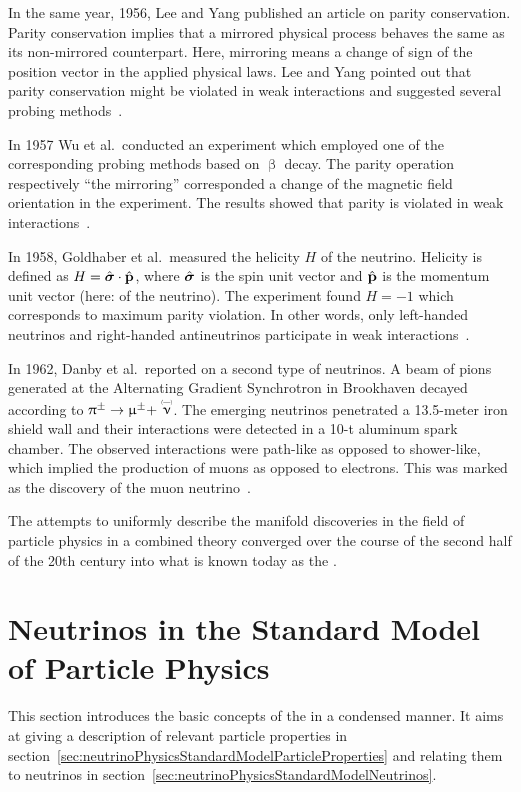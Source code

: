 In the same year, 1956, Lee and Yang published an article on parity conservation. Parity conservation implies that a mirrored physical process behaves the same as its non-mirrored counterpart. Here, mirroring means a change of sign of the position vector in the applied physical laws. Lee and Yang pointed out that parity conservation might be violated in weak interactions and suggested several probing methods~\cite{Lee1956}. 

In 1957 Wu et al.~conducted an experiment which employed one of the corresponding probing methods based on $\upbeta$ decay. The parity operation respectively ``the mirroring'' corresponded a change of the magnetic field orientation in the experiment. The results showed that parity is violated in weak interactions~\cite{Wu1957}. 

In 1958, Goldhaber et al.~measured the helicity $H$ of the neutrino. Helicity is defined as $ H = \hat{\boldsymbol{\mathbf{\sigma}}} \cdot \hat{\boldsymbol{\mathbf{p}}}$, where $\hat{\boldsymbol{\mathbf{\sigma}}}$ is the spin unit vector and $\hat{\boldsymbol{\mathbf{p}}}$ is the momentum unit vector (here: of the neutrino). The experiment found $H = -1$ which corresponds to maximum parity violation. In other words, only left-handed neutrinos and right-handed antineutrinos participate in weak interactions~\cite{Goldhaber1958}.

In 1962, Danby et al.~reported on a second type of neutrinos. A beam of pions generated at the Alternating Gradient Synchrotron in Brookhaven decayed according to $\uppi^{\pm} \rightarrow \upmu^{\pm} + \maybeaneutrino$. The emerging neutrinos penetrated a 13.5-meter iron shield wall and their interactions were detected in a 10-t aluminum spark chamber. The observed interactions were path-like as opposed to shower-like, which implied the production of muons as opposed to electrons. This was marked as the discovery of the muon neutrino~\cite{Danby1962}.

The attempts to uniformly describe the manifold discoveries in the field of particle physics in a combined theory converged over the course of the second half of the 20th century into what is known today as the .
    
\section{Neutrinos in the Standard Model of Particle Physics}
\label{sec:neutrinoPhysicsStandardModel}
This section introduces the basic concepts of the  in a condensed manner. It aims at giving a description of relevant particle properties in section~\ref{sec:neutrinoPhysicsStandardModelParticleProperties} and relating them to neutrinos in section~\ref{sec:neutrinoPhysicsStandardModelNeutrinos}.

